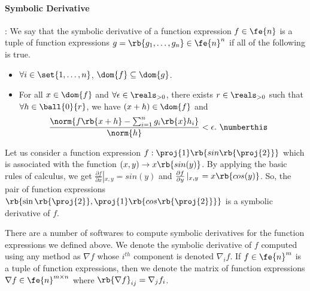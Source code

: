 \paragraph{Symbolic Derivative}:  We say that the symbolic derivative of a function
expression $f\in\fe{n}$ is a tuple of function
expressions $g = \rb{g_1,\ldots,g_n}\in\fe{n}^n$ if all of the
following is true.
%
\begin{itemize}
\item $\forall i\in\set{1,\ldots,n}$, $\dom{f}\subseteq \dom{g}$.
\item For all $x\in\dom{f}$ and $\forall\epsilon\in\reals_{>0}$, there exists $r\in\reals_{>0}$ 
such that $\forall h\in\ball{0}{r}$, we have $(x+h)\in\dom{f}$ and
%
\begin{align*}
& \frac{\norm{f\rb{x+h}-\sum_{i=1}^n g_i\rb{x}h_i}}{\norm{h}}
< \epsilon.~\numberthis\label{eqn:symder}
\end{align*}
%
\end{itemize}
%
\begin{example}
Let us consider a function expression
$f:\proj{1}\rb{sin\rb{\proj{2}}}$ which is associated with the
function $(x,y)\rightarrow x\rb{sin(y)}$.  By applying the basic rules
of calculus, we get
$\frac{\partial{f}}{\partial{x}}\left|_{x,y}\right. = sin(y)$ and
$\frac{\partial{f}}{\partial{y}}\left|_{x,y}\right. =
x\rb{cos(y)}$. So, the pair of function expressions
$\rb{ \sin\rb{\proj{2}}, \proj{1}\rb{cos\rb{\proj{2}}}}$ is a symbolic
derivative of $f$.
\end{example}
%
There are a number of softwares to compute symbolic derivatives for
the function expressions we defined above. 
We denote the symbolic derivative of $f$ computed using any method as
$\nabla f$ whose $i^{th}$ component is denoted $\nabla_i f$.  If
$f\in\fe{n}^m$ is a tuple of function expressions, then we denote the
matrix of function expressions $\nabla f\in\fe{n}^{m\times n}$ where
$\rb{\nabla f}_{ij} = \nabla_j f_i$.
%
